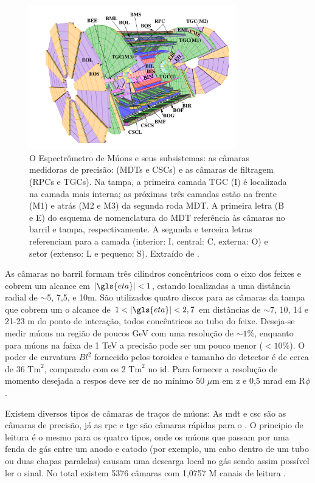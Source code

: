 \begin{figure}[h!t]
\centering
\includegraphics[width=0.8\textwidth]{imagens/Muon_system_Initial.pdf}
\caption[O Espectrômetro de Múons]{
O Espectrômetro de Múons e seus subsistemas: as câmaras medidoras de
precisão: (MDTs e CSCs) e as câmaras de filtragem (RPCs e TGCs). Na tampa, a
primeira camada TGC (I) é localizada na camada mais interna; as próximas três
camadas estão na frente (M1) e atrás (M2 e M3) da segunda roda MDT. A primeira
letra (B e E) do esquema de nomenclatura do MDT referência às câmaras no barril
e tampa, respectivamente. A segunda e terceira letras referenciam para a camada
(interior: I, central: C, externa: O) e setor (extenso: L e pequeno: S). Extraído de
\cite{paper_atlas}.}
\label{fig:espec_muons}
\end{figure}

As câmaras no barril formam três cilindros
concêntricos com o eixo dos feixes e cobrem um alcance em $|\gls{eta}| < 1$,
estando localizadas a uma distância radial de $\sim$5, 7,5, e 10m. São
utilizados quatro discos para as câmaras da tampa que cobrem um o alcance de 
$1 < |\gls{eta}| < 2,7$ em distâncias de $\sim$7, 10, 14 e 21-23 m do ponto de
interação, todos concêntricos ao tubo do feixe. Deseja-se medir múons
na região de poucos GeV com uma resolução de $\sim1\%$, enquanto para múons na
faixa de 1 TeV a precisão pode ser um pouco menor ($ < 10\%$). O poder de
curvatura $Bl^2$ fornecido pelos toroides e tamanho do detector é de cerca de 36
$\text{Tm}^2$, comparado com os 2 $\text{Tm}^2$ no \gls{id}. Para fornecer a
resolução de momento desejada a \gls{respos} deve ser de no mínimo
50 $\mu$m em z e 0,5 mrad em R$\phi$ \cite{ATLAS_TDR}.

Existem diversos tipos de câmaras de traços de múons: As \gls{mdt} e \gls{csc}
são as câmaras de precisão, já as \gls{rpc} e \gls{tgc} são câmaras
rápidas para o . O principio de leitura é o mesmo para os quatro
tipos, onde os múons que passam por uma fenda de gás entre um anodo e catodo (por
exemplo, um cabo dentro de um tubo ou duas chapas paralelas) causam uma descarga
local no gás sendo assim possível ler o sinal. No total existem 5376 câmaras
com 1,0757 M canais de leitura \cite{tese_jatos}.

